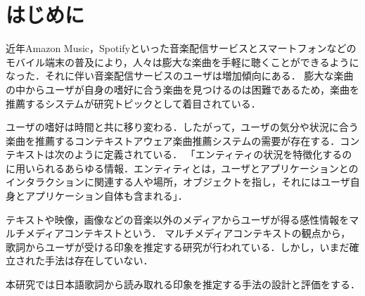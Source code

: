 \documentclass[a4paper,10pt,twocolumn]{jsarticle}
\begin{document}
\section{はじめに}
近年Amazon Music，Spotifyといった音楽配信サービスとスマートフォンなどのモバイル端末の普及により，人々は膨大な楽曲を手軽に聴くことができるようになった．それに伴い音楽配信サービスのユーザは増加傾向にある\cite{1}．
膨大な楽曲の中からユーザが自身の嗜好に合う楽曲を見つけるのは困難であるため，楽曲を推薦するシステムが研究トピックとして着目されている．

ユーザの嗜好は時間と共に移り変わる．したがって，ユーザの気分や状況に合う楽曲を推薦するコンテキストアウェア楽曲推薦システムの需要が存在する．コンテキストは次のように定義されている．
「エンティティの状況を特徴化するのに用いられるあらゆる情報．エンティティとは，ユーザとアプリケーションとのインタラクションに関連する人や場所，オブジェクトを指し，それにはユーザ自身とアプリケーション自体も含まれる」\cite{2}．

テキストや映像，画像などの音楽以外のメディアからユーザが得る感性情報をマルチメディアコンテキストという．
マルチメディアコンテキストの観点から，歌詞からユーザが受ける印象を推定する研究が行われている．しかし，いまだ確立された手法は存在していない．

本研究では日本語歌詞から読み取れる印象を推定する手法の設計と評価をする．
%
\end{document}
